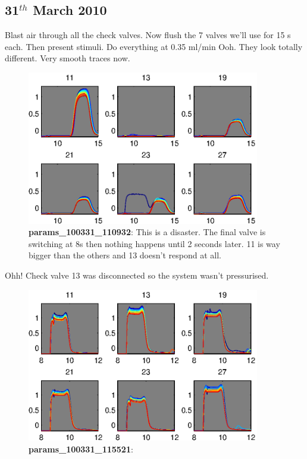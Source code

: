 \documentclass[a4paper]{report}
\begin{document}
\clearpage
\subsection{31$^{th}$ March 2010}
Blast air through all the check valves. Now flush the 7 valves we'll
use for 15 s each. Then present stimuli. Do everything at 0.35 ml/min
Ooh. They look totally different. Very smooth traces now. 

\begin{figure}[h]
\centering
\includegraphics[width=4in]{params_100331_110932.eps}
\caption{\textbf{params\_100331\_110932}: This is a disaster. The
  final valve is switching at 8s then nothing happens until 2 seconds
  later. 11 is way bigger than the others and 13 doesn't respond at
  all. }
\end{figure}
Ohh! Check valve 13 was disconnected so the system wasn't
pressurised. 


\begin{figure}[h]
\centering
\includegraphics[width=4in]{params_100331_115521.eps}
\caption{\textbf{params\_100331\_115521}:}
\end{figure}
\end{document}
